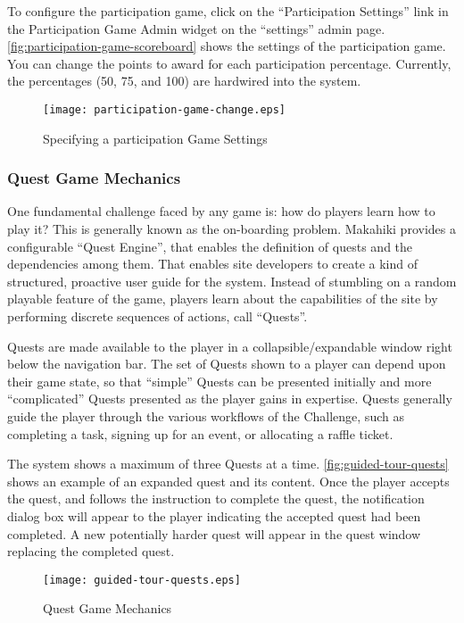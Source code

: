 To configure the participation game, click on the ``Participation Settings'' link in the Participation Game Admin widget on the ``settings'' admin page. \autoref{fig:participation-game-scoreboard} shows the settings of the participation game. You can change the points to award for each participation percentage. Currently, the percentages (50, 75, and 100) are hardwired into the system.

\begin{figure}[!ht]
  \center
  \texttt{[image: participation-game-change.eps]}
  \caption{Specifying a participation Game Settings}
  \label{fig:participation-game-change}
\end{figure}

\subsubsection{Quest Game Mechanics}
One fundamental challenge faced by any game is: how do players learn how to play it? This is generally known as the on-boarding problem. Makahiki provides a configurable ``Quest Engine'', that enables the definition of quests and the dependencies among them. That enables site developers to create a kind of structured, proactive user guide for the system. Instead of stumbling on a random playable feature of the game, players learn about the capabilities of the site by performing discrete sequences of actions, call ``Quests''. 

Quests are made available to the player in a collapsible/expandable window right below the navigation bar. The set of Quests shown to a player can depend upon their game state, so that ``simple'' Quests can be presented initially and more ``complicated'' Quests presented as the player gains in expertise. Quests generally guide the player through the various workflows of the Challenge, such as completing a task, signing up for an event, or allocating a raffle ticket.

The system shows a maximum of three Quests at a time. \autoref{fig:guided-tour-quests} shows an example of an expanded quest and its content. Once the player accepts the quest, and follows the instruction to complete the quest, the notification dialog box will appear to the player indicating the accepted quest had been completed. A new potentially harder quest will appear in the quest window replacing the completed quest.

\begin{figure}[!ht]
  \center
  \texttt{[image: guided-tour-quests.eps]}
  \caption{Quest Game Mechanics}
  \label{fig:guided-tour-quests}
\end{figure}

